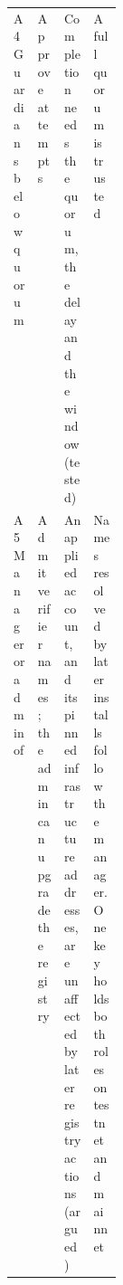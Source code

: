 \begin{table}[tbp]
\begin{tabularx}{\linewidth}{@{}>{\raggedright\arraybackslash}p{0.14\linewidth}LLL@{}}
A4 Guardians below quorum & Approve attempts & Completion needs the quorum, the delay and the window (tested) & A full quorum is trusted \\
A5 Manager or admin of  & Admit verifier names; the admin can upgrade the registry & An applied account, and its pinned infrastructure addresses, are unaffected by later registry actions (argued) & Names resolved by later installs follow the manager. One key holds both roles on testnet and mainnet \\
\bottomrule
\end{tabularx}
\end{table}

